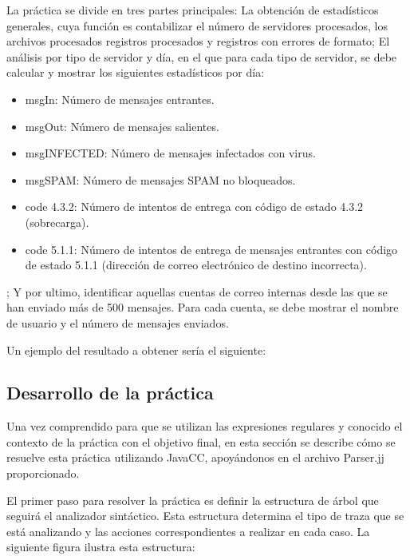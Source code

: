\noindent La práctica se divide en tres partes principales: La obtención de estadísticos generales, cuya función es contabilizar el número de servidores procesados, los  archivos procesados registros procesados y registros con errores de formato; El análisis por tipo de servidor y día, en el que para cada tipo de servidor, se debe calcular y mostrar los siguientes estadísticos por día:

\begin{itemize}
    \item msgIn: Número de mensajes entrantes.
    \item msgOut: Número de mensajes salientes.
    \item msgINFECTED: Número de mensajes infectados con virus.
    \item msgSPAM: Número de mensajes SPAM no bloqueados.
    \item code 4.3.2: Número de intentos de entrega con código de estado 4.3.2 (sobrecarga).
    \item code 5.1.1: Número de intentos de entrega de mensajes  entrantes con código de estado 5.1.1 (dirección de correo electrónico de destino incorrecta).
\end{itemize}

; Y por ultimo, identificar aquellas cuentas de correo internas desde las que se han enviado más de 500 mensajes. Para cada cuenta, se debe mostrar el nombre de usuario y el número de mensajes enviados.

Un ejemplo del resultado a obtener sería el siguiente:

\lstset{inputencoding=utf8/latin1}


\subsection{Desarrollo de la práctica}

Una vez comprendido para que se utilizan las expresiones regulares y conocido el contexto de la práctica con el objetivo final, en esta sección se describe cómo se resuelve esta práctica utilizando JavaCC, apoyándonos en el archivo Parser.jj proporcionado.

El primer paso para resolver la práctica es definir la estructura de árbol que seguirá el analizador sintáctico. Esta estructura determina el tipo de traza que se está analizando y las acciones correspondientes a realizar en cada caso. La siguiente figura ilustra esta estructura:

